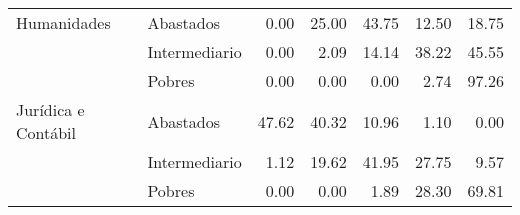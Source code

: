 \begin{table}[ht]
\begin{tabular}{ll rrrrr}
  Humanidades             & Abastados               &               0.00 &        25.00 &       43.75 &      12.50 &            18.75 \\ 
                          & Intermediario           &               0.00 &         2.09 &       14.14 &      38.22 &            45.55 \\ 
                          & Pobres                  &               0.00 &         0.00 &        0.00 &       2.74 &            97.26 \\ 
  Jurídica e Contábil     & Abastados               &              47.62 &        40.32 &       10.96 &       1.10 &             0.00 \\ 
                          & Intermediario           &               1.12 &        19.62 &       41.95 &      27.75 &             9.57 \\ 
                          & Pobres                  &               0.00 &         0.00 &        1.89 &      28.30 &            69.81 \\ 
   \bottomrule
\end{tabular}
\end{table}

